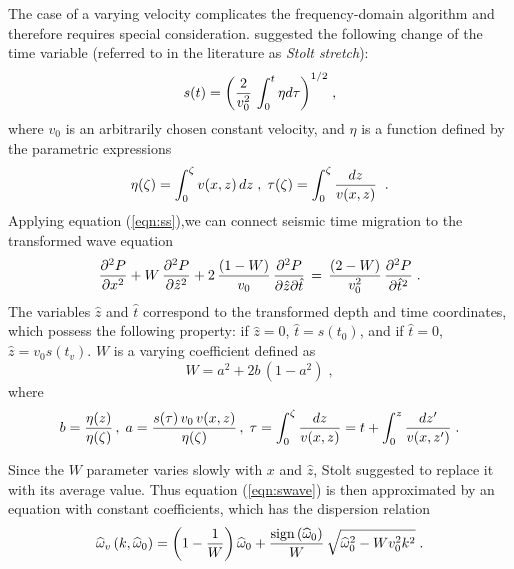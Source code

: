 The case of a varying velocity complicates the frequency-domain
algorithm and therefore requires special consideration.
 suggested the following change of the
time variable (referred to in the literature as {\em Stolt stretch}):
\begin{equation}
s(t)={\left({{2 \over v_0^2}\,\int_0^t\eta d \tau}\right)}^{1/2}\;,
\label{eqn:ss} 
\end{equation}
where $v_0$ is an arbitrarily chosen constant velocity, and $\eta$ is a
function defined by the parametric expressions
\begin{equation}
\eta(\zeta)=\int_0^{\zeta} v(x,z) \,dz \;,\;
\tau(\zeta)=\int_0^{\zeta} { {dz} \over {v(x,z)}}\;\;.
\end{equation} 
Applying equation (\ref{eqn:ss}),we can connect seismic time migration
to the transformed wave equation
\begin{equation}
{\partial^2 P \over \partial x^2} +
W\,{\partial^2 P \over \partial \hat{z}^2} + 2\, {{(1-W)} \over v_0}\,
{{\partial^2 P} \over {\partial \hat{z} \partial \hat{t}}}  \, = 
\,{(2-W) \over v_0^2 }\,
{\partial^2 P \over \partial \hat{t}^2}\;. 
\label{eqn:swave} 
\end{equation}
The variables $\hat{z}$ and $\hat{t}$ correspond to the transformed
depth and time coordinates, which possess the following property: if
$\hat{z}=0$, $\hat{t}=s\left(t_0\right)$, and if $\hat{t}=0$,
$\hat{z}=v_0 s\left(t_v\right)$. $W$ is a varying coefficient defined
as
\begin{equation}
W=a^2+2b\,(1-a^2)\;,
\label{eqn:wstolt} 
\end{equation}
where 
\begin{eqnarray*}
b={{\eta(z)}\over{\eta(\zeta)}}\,,\;
a={{s(\tau)\,v_0\,v(x,z)}\over{\eta(\zeta)}}\,,\;
\tau=\int_0^\zeta{{dz}\over{v(x,z)}}=t+ \int_0^z{{dz'}\over{v(x,z')}}\;.
\end{eqnarray*}

Since the $W$ parameter varies slowly with $x$ and $\hat{z}$, Stolt
suggested to replace it with its average value.  Thus equation
(\ref{eqn:swave}) is then approximated by an equation with constant
coefficients, which has the dispersion relation
\begin{equation}
\widehat{\omega}_v\left(k,\widehat{\omega}_0 \right)=
\left(1-{1\over W}\right) \widehat{\omega}_0+
{{\mbox{sign}\left(\widehat{\omega}_0\right)}\over W}\,
\sqrt{\widehat{\omega}_0^2 - W v_0^2 k^2}\;.
\label{eqn:sdispersion} 
\end{equation}


